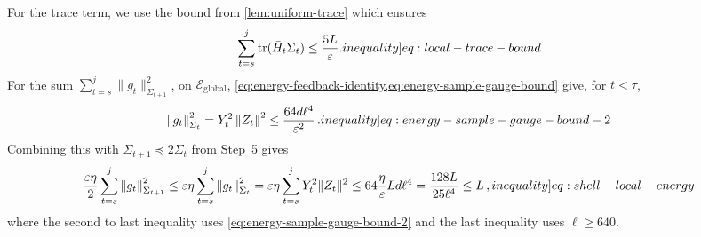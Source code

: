 \documentclass[12pt,cleveref]{jmlr}
\newcommand{\ineqlabel}[1]{\label[inequality]{#1}}
\newcommand{\tr}{\operatorname{tr}}
\newcommand{\1}{\mathbf 1}
\newcommand{\eps}{\varepsilon}
\newcommand{\norm}[1]{\left\lVert #1\right\rVert}
\newcommand{\normm}[2]{\left\lVert #1\right\rVert_{#2}}
\begin{document}
For the trace term, we use the bound from \cref{lem:uniform-trace} which ensures
\begin{align}
    \sum_{t=s}^{j}\tr(\bar H_t\Sigma_t)\leq\frac{5L}{\eps}.
    \ineqlabel{eq:local-trace-bound}
\end{align}
For the sum $\sum_{t=s}^{j}\|g_t\|_{\Sigma_{t+1}}^2$, on $\mathcal E_{\mathrm{global}}$,
\cref{eq:energy-feedback-identity,eq:energy-sample-gauge-bound} give, for $t<\tau$,
\begin{align}
    \normm{g_t}{\Sigma_t}^2
    =Y_t^2\norm{Z_t}^2
    \leq\frac{64d\ell^4}{\eps^2}\,.
    \ineqlabel{eq:energy-sample-gauge-bound-2}
\end{align}
Combining this with $\Sigma_{t+1}\preceq2\Sigma_t$ from Step~5 gives
\begin{align}
    \frac{\eps\eta}{2}\sum_{t=s}^{j}\normm{g_t}{\Sigma_{t+1}}^2
    \leq
    \eps\eta\sum_{t=s}^{j}\normm{g_t}{\Sigma_{t}}^2
    =
    \eps\eta\sum_{t=s}^{j} Y_t^2 \|Z_t\|^2
    \leq64\frac{\eta}{\eps}Ld\ell^4
    =\frac{128L}{25\ell^4}\leq L\,,
    \ineqlabel{eq:shell-local-energy}
\end{align}
where the second to last inequality uses \cref{eq:energy-sample-gauge-bound-2}
and the last inequality uses $\ell\geq 640$.
\end{document}
